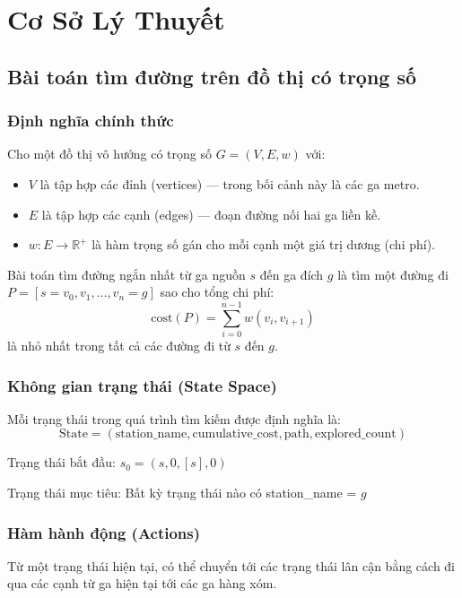 
\chapter{Cơ Sở Lý Thuyết}

\section{Bài toán tìm đường trên đồ thị có trọng số}

\subsection{Định nghĩa chính thức}

Cho một đồ thị vô hướng có trọng số $G = (V, E, w)$ với:
\begin{itemize}
  \item $V$ là tập hợp các đỉnh (vertices) --- trong bối cảnh này là các ga metro.
  \item $E$ là tập hợp các cạnh (edges) --- đoạn đường nối hai ga liền kề.
  \item $w: E \to \mathbb{R}^+$ là hàm trọng số gán cho mỗi cạnh một giá trị dương (chi phí).
\end{itemize}

Bài toán tìm đường ngắn nhất từ ga nguồn $s$ đến ga đích $g$ là tìm một đường đi $P = [s = v_0, v_1, \ldots, v_n = g]$ sao cho tổng chi phí:
\[
  \text{cost}(P) = \sum_{i=0}^{n-1} w(v_i, v_{i+1})
\]
là nhỏ nhất trong tất cả các đường đi từ $s$ đến $g$.

\subsection{Không gian trạng thái (State Space)}

Mỗi trạng thái trong quá trình tìm kiếm được định nghĩa là:
\[
  \text{State} = (\text{station\_name}, \text{cumulative\_cost}, \text{path}, \text{explored\_count})
\]

Trạng thái bắt đầu: $s_0 = (s, 0, [s], 0)$

Trạng thái mục tiêu: Bất kỳ trạng thái nào có station\_name = $g$

\subsection{Hàm hành động (Actions)}

Từ một trạng thái hiện tại, có thể chuyển tới các trạng thái lân cận bằng cách đi qua các cạnh từ ga hiện tại tới các ga hàng xóm.

